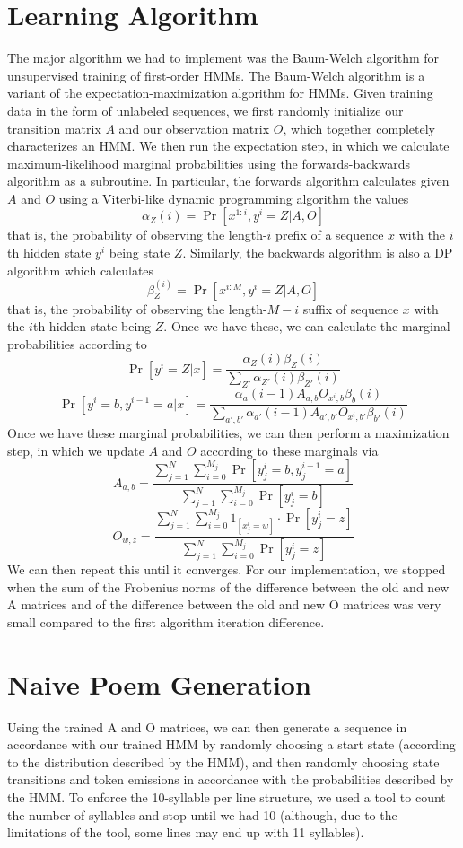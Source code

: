 \section{Learning Algorithm}
The major algorithm we had to implement was the Baum-Welch algorithm for unsupervised training of first-order HMMs. The Baum-Welch algorithm is a variant of the expectation-maximization algorithm for HMMs. Given training data in the form of unlabeled sequences, we first randomly initialize our transition matrix $A$ and our observation matrix $O$, which together completely characterizes an HMM. We then run the expectation step, in which we calculate maximum-likelihood marginal probabilities using the forwards-backwards algorithm as a subroutine. In particular, the forwards algorithm calculates given $A$ and $O$ using a Viterbi-like dynamic programming algorithm the values
$$\alpha_Z(i) = \Pr[x^{1 : i}, y^i = Z | A, O]$$
that is, the probability of observing the length-$i$ prefix of a sequence $x$ with the $i$th hidden state $y^i$ being state $Z$. Similarly, the backwards algorithm is also a DP algorithm which calculates
$$\beta_Z^(i) = \Pr[x^{i : M}, y^i = Z | A, O]$$
that is, the probability of observing the length-$M - i$ suffix of sequence $x$ with the $i$th hidden state being $Z$.
Once we have these, we can calculate the marginal probabilities according to
$$\Pr[y^i = Z | x] = \frac{\alpha_Z(i)\beta_Z(i)}{\sum_{Z'}{\alpha_{Z'}(i)\beta_{Z'}(i)}}$$
$$\Pr[y^i = b, y^{i - 1} = a | x] = \frac{\alpha_a(i - 1)A_{a, b}O_{x^i, b}\beta_b(i)}{\sum_{a', b'}{\alpha_{a'}(i - 1)A_{a', b'}O_{x^i, b'}\beta_{b'}(i)}}$$
Once we have these marginal probabilities, we can then perform a maximization step, in which we update $A$ and $O$ according to these marginals via
$$A_{a, b} = \frac{\sum_{j = 1}^{N}{\sum_{i = 0}^{M_j}{\Pr[y_j^i = b, y_j^{i + 1} = a]}}}{\sum_{j = 1}^{N}{\sum_{i = 0}^{M_j}{\Pr[y_j^i = b]}}}$$
$$O_{w, z} = \frac{\sum_{j = 1}^{N}{\sum_{i = 0}^{M_j}{1_{[x_j^i = w]} \cdot \Pr[y_j^i = z]}}}{\sum_{j = 1}^{N}{\sum_{i = 0}^{M_j}{\Pr[y_j^i = z]}}}$$
We can then repeat this until it converges. For our implementation, we stopped when the sum of the Frobenius norms of the difference between the old and new A matrices and of the difference between the old and new O matrices was very small compared to the first algorithm iteration difference.

\section{Naive Poem Generation}
\par Using the trained A and O matrices, we can then generate a sequence in accordance with our trained HMM by randomly choosing a start state (according to the distribution described by the HMM), and then randomly choosing state transitions and token emissions in accordance with the probabilities described by the HMM. To enforce the 10-syllable per line structure, we used a tool to count the number of syllables and stop until we had 10 (although, due to the limitations of the tool, some lines may end up with 11 syllables). 


